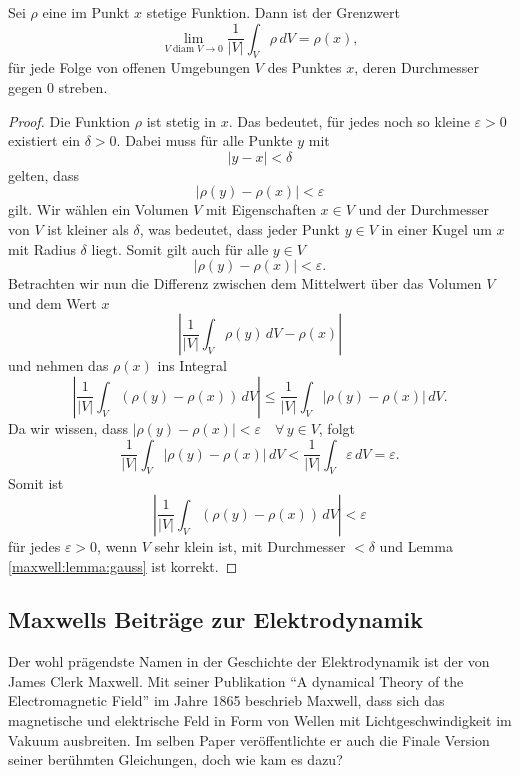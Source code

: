 \begin{lemma}
	\label{maxwell:lemma:gauss}
	Sei $\rho$ eine im Punkt $x$ stetige Funktion. Dann ist der Grenzwert
	\[
	\lim_{V\operatorname{diam}V\to 0} \frac{1}{|V|} \int_V \rho\,dV = \rho(x),
	\]
für jede Folge von offenen Umgebungen $V$ des Punktes $x$, deren Durchmesser gegen 0 streben.
\end{lemma}
\begin{proof}
	Die Funktion $\rho$ ist stetig in $x$. Das bedeutet, für jedes noch so kleine $\varepsilon > 0$ existiert ein $\delta > 0$.
	Dabei muss für alle Punkte $y$ mit
	\[
	\left|y-x\right| < \delta	
	\]
	gelten, dass 
	\[
	\left|\rho(y) - \rho(x)\right| < \varepsilon
	\] 
	gilt.
	Wir wählen ein Volumen $V$ mit Eigenschaften $x \in V$ und der Durchmesser von $V$ ist kleiner als $\delta$, was bedeutet, dass jeder Punkt $y \in V$ in einer Kugel um $x$ mit Radius $\delta$ liegt.
	Somit gilt auch für alle $y \in V$
	\[
	\left|\rho(y) - \rho(x)\right| < \varepsilon .
	\]
	Betrachten wir nun die Differenz zwischen dem Mittelwert über das Volumen $V$ und dem Wert $x$
	\[
	\left|
	\frac{1}{\left|V\right|}
	\int_{V}
	\rho(y)
	\,
	dV
	-
	\rho(x)
	\right|
	\]
	und nehmen das $\rho(x)$ ins Integral
	\[
	\left|
	\frac{1}{\left|V\right|}
	\int_{V}
	(\rho(y) - \rho(x)) \, dV
	\right|
	\leq
	\frac{1}{\left|V\right|}
	\int_{V}
	\left|
	\rho(y) - \rho(x)
	\right|
	\,
	dV .
	\]
	Da wir wissen, dass $\left|\rho(y) - \rho(x)\right| < \varepsilon \quad \forall \, y \in V$, folgt
	\[
	\frac{1}{\left|V\right|}
	\int_{V}
	\left|
	\rho(y) - \rho(x)
	\right|
	\,
	dV
	<
	\frac{1}{\left|V\right|}
	\int_{V}
	\varepsilon
	\,
	dV
	=
	\varepsilon .
	\]
	Somit ist 
	\[
	\left|
	\frac{1}{\left|V\right|}
	\int_{V}
	(\rho(y) - \rho(x)) \, dV
	\right|
	<
	\varepsilon
	\]
	für jedes $\varepsilon > 0$, wenn $V$ sehr klein ist, mit Durchmesser $< \delta$ und Lemma \ref{maxwell:lemma:gauss} ist korrekt.
\end{proof}


\subsection{Maxwells Beiträge zur Elektrodynamik}
Der wohl prägendste Namen in der Geschichte der Elektrodynamik ist der von James Clerk Maxwell.
Mit seiner Publikation ``A dynamical Theory of the Electromagnetic Field'' \cite{maxwell:maxwell:theory} im Jahre 1865 beschrieb Maxwell, dass sich das magnetische und elektrische Feld in Form von Wellen mit Lichtgeschwindigkeit im Vakuum ausbreiten.
Im selben Paper veröffentlichte er auch die Finale Version seiner berühmten Gleichungen, doch wie kam es dazu?

